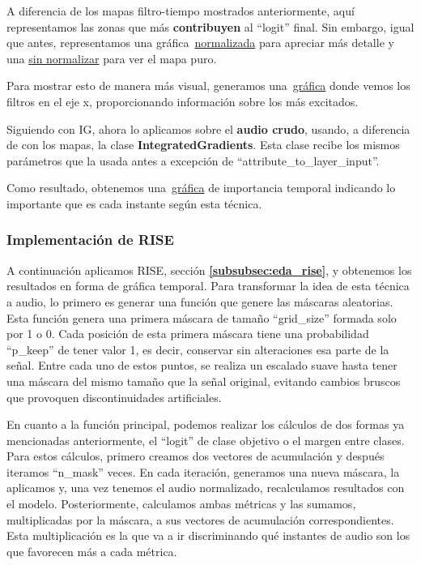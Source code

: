 A diferencia de los mapas filtro-tiempo mostrados anteriormente, aquí representamos las zonas que más \textbf{contribuyen} al ``logit'' final.
Sin embargo, igual que antes, representamos una gráfica~\href{https://github.com/NILGroup/tfg-2526-xplicavoz/blob/main/Memoria/imagenes/AASIST_IG_mapa_normalizado.png}{normalizada} para apreciar más detalle y una \href{https://github.com/NILGroup/tfg-2526-xplicavoz/blob/main/Memoria/imagenes/AASIST_IG_mapa.png}{sin normalizar} para ver el mapa puro.

Para mostrar esto de manera más visual, generamos una~\href{https://github.com/NILGroup/tfg-2526-xplicavoz/blob/main/Memoria/imagenes/AASIST_IG_mapa_frecuencial.png}{gráfica} donde vemos los filtros en el eje x, proporcionando información sobre los más excitados. 

Siguiendo con IG, ahora lo aplicamos sobre el \textbf{audio crudo}, usando, a diferencia de con los mapas, la clase \textbf{IntegratedGradients}. Esta clase recibe los mismos parámetros que la usada antes a excepción de ``attribute\_to\_layer\_input''.  

Como resultado, obtenemos una~\href{https://github.com/NILGroup/tfg-2526-xplicavoz/blob/main/Memoria/imagenes/AASIST_IG_audio.png}{gráfica} de importancia temporal indicando lo importante que es cada instante según esta técnica.

\subsubsection*{Implementación de RISE}

A continuación aplicamos RISE, sección \textbf{\ref{subsubsec:eda_rise}}, y obtenemos los resultados en forma de gráfica temporal.
Para transformar la idea de esta técnica a audio, lo primero es generar una función que genere las máscaras aleatorias. Esta función genera una primera máscara de tamaño ``grid\_size'' formada solo por 1 o 0. Cada posición de esta primera máscara tiene una probabilidad ``p\_keep'' de tener valor 1, es decir, conservar sin alteraciones esa parte de la señal. Entre cada uno de estos puntos, se realiza un escalado suave hasta tener una máscara del mismo tamaño que la señal original, evitando cambios bruscos que provoquen discontinuidades artificiales.

En cuanto a la función principal, podemos realizar los cálculos de dos formas ya mencionadas anteriormente, el ``logit'' de clase objetivo o el margen entre clases. Para estos cálculos, primero creamos dos vectores de acumulación y después iteramos ``n\_mask'' veces.
En cada iteración, generamos una nueva máscara, la aplicamos y, una vez tenemos el audio normalizado, recalculamos resultados con el modelo. Posteriormente, calculamos ambas métricas y las sumamos, multiplicadas por la máscara, a sus vectores de acumulación correspondientes.
Esta multiplicación es la que va a ir discriminando qué instantes de audio son los que favorecen más a cada métrica.

